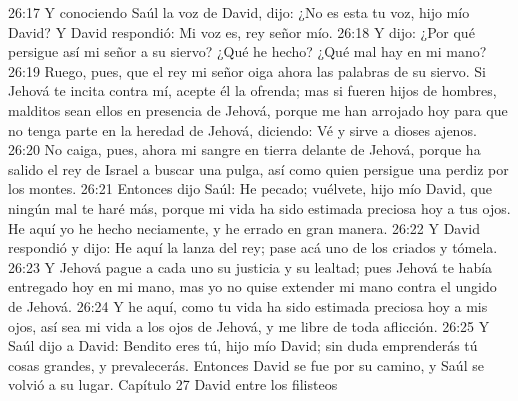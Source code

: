 26:17 Y conociendo Saúl la voz de David, dijo: ¿No es esta tu voz, hijo mío David? Y David respondió: Mi voz es, rey señor mío.  
26:18 Y dijo: ¿Por qué persigue así mi señor a su siervo? ¿Qué he hecho? ¿Qué mal hay en mi mano?  
26:19 Ruego, pues, que el rey mi señor oiga ahora las palabras de su siervo. Si Jehová te incita contra mí, acepte él la ofrenda; mas si fueren hijos de hombres, malditos sean ellos en presencia de Jehová, porque me han arrojado hoy para que no tenga parte en la heredad de Jehová, diciendo: Vé y sirve a dioses ajenos.  
26:20 No caiga, pues, ahora mi sangre en tierra delante de Jehová, porque ha salido el rey de Israel a buscar una pulga, así como quien persigue una perdiz por los montes.  
26:21 Entonces dijo Saúl: He pecado; vuélvete, hijo mío David, que ningún mal te haré más, porque mi vida ha sido estimada preciosa hoy a tus ojos. He aquí yo he hecho neciamente, y he errado en gran manera.  
26:22 Y David respondió y dijo: He aquí la lanza del rey; pase acá uno de los criados y tómela.  
26:23 Y Jehová pague a cada uno su justicia y su lealtad; pues Jehová te había entregado hoy en mi mano, mas yo no quise extender mi mano contra el ungido de Jehová.  
26:24 Y he aquí, como tu vida ha sido estimada preciosa hoy a mis ojos, así sea mi vida a los ojos de Jehová, y me libre de toda aflicción.  
26:25 Y Saúl dijo a David: Bendito eres tú, hijo mío David; sin duda emprenderás tú cosas grandes, y prevalecerás. Entonces David se fue por su camino, y Saúl se volvió a su lugar.  
Capítulo 27 
David entre los filisteos  

